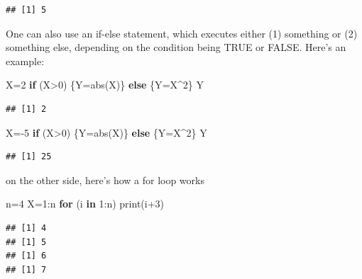 \documentclass[
]{article}
\newenvironment{Shaded}{\begin{snugshade}}{\end{snugshade}}
\newcommand{\ControlFlowTok}[1]{\textcolor[rgb]{0.13,0.29,0.53}{\textbf{#1}}}
\newcommand{\DecValTok}[1]{\textcolor[rgb]{0.00,0.00,0.81}{#1}}
\newcommand{\FunctionTok}[1]{\textcolor[rgb]{0.00,0.00,0.00}{#1}}
\newcommand{\NormalTok}[1]{#1}
\newcommand{\OtherTok}[1]{\textcolor[rgb]{0.56,0.35,0.01}{#1}}
\newcommand{\SpecialCharTok}[1]{\textcolor[rgb]{0.00,0.00,0.00}{#1}}
\begin{document}
\begin{verbatim}
## [1] 5
\end{verbatim}

One can also use an if-else statement, which executes either (1)
something or (2) something else, depending on the condition being TRUE
or FALSE. Here's an example:

\begin{Shaded}
\begin{Highlighting}[]
\NormalTok{X}\OtherTok{=}\DecValTok{2}
\ControlFlowTok{if}\NormalTok{ (X}\SpecialCharTok{\textgreater{}}\DecValTok{0}\NormalTok{)}
\NormalTok{  \{Y}\OtherTok{=}\FunctionTok{abs}\NormalTok{(X)\} }\ControlFlowTok{else} 
\NormalTok{  \{Y}\OtherTok{=}\NormalTok{X}\SpecialCharTok{\^{}}\DecValTok{2}\NormalTok{\}}
\NormalTok{Y}
\end{Highlighting}
\end{Shaded}

\begin{verbatim}
## [1] 2
\end{verbatim}

\begin{Shaded}
\begin{Highlighting}[]
\NormalTok{X}\OtherTok{=}\SpecialCharTok{{-}}\DecValTok{5}
\ControlFlowTok{if}\NormalTok{ (X}\SpecialCharTok{\textgreater{}}\DecValTok{0}\NormalTok{)}
\NormalTok{  \{Y}\OtherTok{=}\FunctionTok{abs}\NormalTok{(X)\} }\ControlFlowTok{else} 
\NormalTok{  \{Y}\OtherTok{=}\NormalTok{X}\SpecialCharTok{\^{}}\DecValTok{2}\NormalTok{\}}
\NormalTok{Y}
\end{Highlighting}
\end{Shaded}

\begin{verbatim}
## [1] 25
\end{verbatim}

on the other side, here's how a for loop works

\begin{Shaded}
\begin{Highlighting}[]
\NormalTok{n}\OtherTok{=}\DecValTok{4}
\NormalTok{X}\OtherTok{=}\DecValTok{1}\SpecialCharTok{:}\NormalTok{n}
\ControlFlowTok{for}\NormalTok{ (i }\ControlFlowTok{in} \DecValTok{1}\SpecialCharTok{:}\NormalTok{n) }\FunctionTok{print}\NormalTok{(i}\SpecialCharTok{+}\DecValTok{3}\NormalTok{)}
\end{Highlighting}
\end{Shaded}

\begin{verbatim}
## [1] 4
## [1] 5
## [1] 6
## [1] 7
\end{verbatim}
\end{document}
